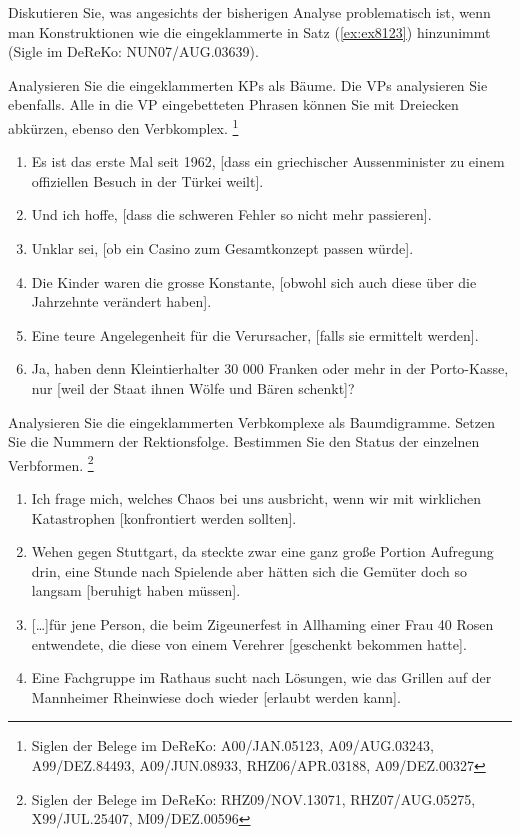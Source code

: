 \begin{sloppypar}
\Uebung[\tristar] \label{u113} Diskutieren Sie, was angesichts der bisherigen Analyse problematisch ist, wenn man Konstruktionen wie die eingeklammerte in Satz (\ref{ex:ex8123}) hinzunimmt (Sigle im DeReKo: NUN07\slash AUG.03639).

\begin{exe}
\end{exe}

\Uebung \label{u114} Analysieren Sie die eingeklammerten KPs als Bäume.
Die VPs analysieren Sie ebenfalls.
Alle in die VP eingebetteten Phrasen können Sie mit Dreiecken abkürzen, ebenso den Verbkomplex.%
\footnote{Siglen der Belege im DeReKo: A00\slash JAN.05123, A09\slash AUG.03243, A99\slash DEZ.84493, A09\slash JUN.08933, RHZ06\slash APR.03188, A09\slash DEZ.00327}

\begin{enumerate}\Lf
  \item Es ist das erste Mal seit 1962, [dass ein griechischer Aussenminister zu einem offiziellen Besuch in der Türkei weilt].
  \item Und ich hoffe, [dass die schweren Fehler so nicht mehr passieren].
  \item Unklar sei, [ob ein Casino zum Gesamtkonzept passen würde].
  \item Die Kinder waren die grosse Konstante, [obwohl sich auch diese über die Jahrzehnte verändert haben].
  \item Eine teure Angelegenheit für die Verursacher, [falls sie ermittelt werden].
  \item Ja, haben denn Kleintierhalter 30 000 Franken oder mehr in der Porto-Kasse, nur [weil der Staat ihnen Wölfe und Bären schenkt]?
\end{enumerate}

\Uebung \label{u115} Analysieren Sie die eingeklammerten Verbkomplexe als Baumdigramme.
Setzen Sie die Nummern der Rektionsfolge.
Bestimmen Sie den Status der einzelnen Verbformen.%
\footnote{Siglen der Belege im DeReKo: RHZ09\slash NOV.13071, RHZ07\slash AUG.05275, X99\slash JUL.25407, M09\slash DEZ.00596}

\begin{enumerate}\Lf
  \item Ich frage mich, welches Chaos bei uns ausbricht, wenn wir mit wirklichen Katastrophen [konfrontiert werden sollten].
  \item Wehen gegen Stuttgart, da steckte zwar eine ganz große Portion Aufregung drin, eine Stunde nach Spielende aber hätten sich die Gemüter doch so langsam [beruhigt haben müssen].
  \item{} [\ldots]für jene Person, die beim Zigeunerfest in Allhaming einer Frau 40 Rosen entwendete, die diese von einem Verehrer [geschenkt bekommen hatte].
  \item Eine Fachgruppe im Rathaus sucht nach Lösungen, wie das Grillen auf der Mannheimer Rheinwiese doch wieder [erlaubt werden kann].
\end{enumerate}

\end{sloppypar}
